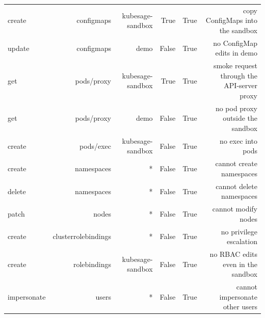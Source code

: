 \begin{table}[t]
\begin{tabular}{lrrrrr}
create & configmaps & kubesage-sandbox & True & True & copy ConfigMaps into the sandbox \\
update & configmaps & demo & False & True & no ConfigMap edits in demo \\
get & pods/proxy & kubesage-sandbox & True & True & smoke request through the API-server proxy \\
get & pods/proxy & demo & False & True & no pod proxy outside the sandbox \\
create & pods/exec & kubesage-sandbox & False & True & no exec into pods \\
create & namespaces & * & False & True & cannot create namespaces \\
delete & namespaces & * & False & True & cannot delete namespaces \\
patch & nodes & * & False & True & cannot modify nodes \\
create & clusterrolebindings & * & False & True & no privilege escalation \\
create & rolebindings & kubesage-sandbox & False & True & no RBAC edits even in the sandbox \\
impersonate & users & * & False & True & cannot impersonate other users \\
\bottomrule
\end{tabular}
\end{table}
